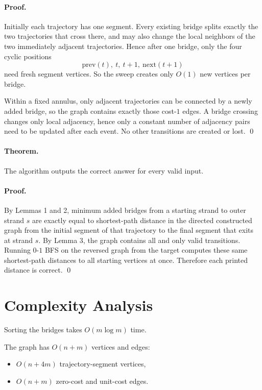 \documentclass[11pt]{article}
\begin{document}
\paragraph{Proof.}
Initially each trajectory has one segment. Every existing bridge splits exactly the two trajectories that
cross there, and may also change the local neighbors of the two immediately adjacent trajectories. Hence
after one bridge, only the four cyclic positions
\[
    \text{prev}(t),\ t,\ t+1,\ \text{next}(t+1)
\]
need fresh segment vertices. So the sweep creates only $O(1)$ new vertices per bridge.

Within a fixed annulus, only adjacent trajectories can be connected by a newly added bridge, so the
graph contains exactly those cost-$1$ edges. A bridge crossing changes only local adjacency, hence only
a constant number of adjacency pairs need to be updated after each event. No other transitions are
created or lost. \qed

\paragraph{Theorem.}
The algorithm outputs the correct answer for every valid input.

\paragraph{Proof.}
By Lemmas 1 and 2, minimum added bridges from a starting strand to outer strand $s$ are exactly equal
to shortest-path distance in the directed constructed graph from the initial segment of that trajectory to
the final segment that exits at strand $s$. By Lemma 3, the graph contains all and only valid transitions.
Running $0$-$1$ BFS on the reversed graph from the target computes these same shortest-path distances to
all starting vertices at once. Therefore each printed distance is correct. \qed

\section*{Complexity Analysis}

Sorting the bridges takes $O(m \log m)$ time.

The graph has $O(n+m)$ vertices and edges:
\begin{itemize}[leftmargin=*]
    \item $O(n+4m)$ trajectory-segment vertices,
    \item $O(n+m)$ zero-cost and unit-cost edges.
\end{itemize}
\end{document}
